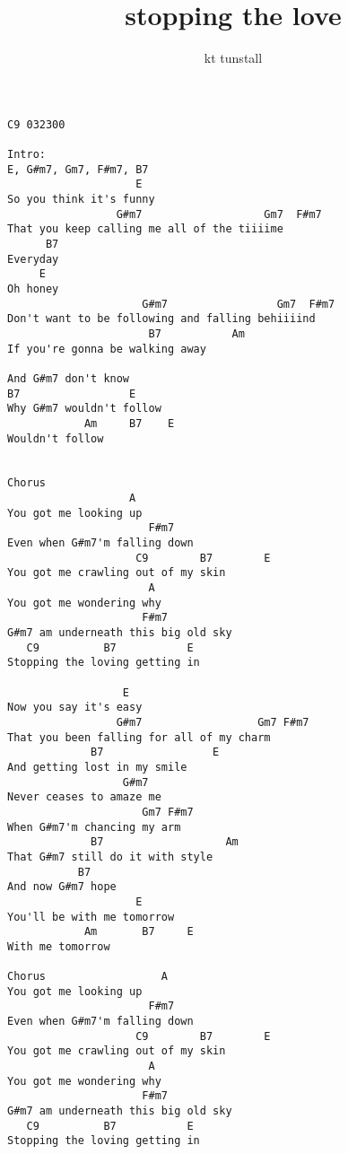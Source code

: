 \author{kt tunstall}
\title{stopping the love}
\maketitle
\begin{verbatim}
C9 032300

Intro:
E, G#m7, Gm7, F#m7, B7
                    E
So you think it's funny
                 G#m7                   Gm7  F#m7
That you keep calling me all of the tiiiime
      B7
Everyday
     E
Oh honey
                     G#m7                 Gm7  F#m7     
Don't want to be following and falling behiiiind
                      B7           Am
If you're gonna be walking away
    
And G#m7 don't know
B7                 E
Why G#m7 wouldn't follow
            Am     B7    E
Wouldn't follow


Chorus
                   A
You got me looking up
                      F#m7
Even when G#m7'm falling down
                    C9        B7        E
You got me crawling out of my skin
                      A
You got me wondering why
                     F#m7
G#m7 am underneath this big old sky
   C9          B7           E
Stopping the loving getting in
        
                  E
Now you say it's easy
                 G#m7                  Gm7 F#m7 
That you been falling for all of my charm
             B7                 E
And getting lost in my smile
                  G#m7
Never ceases to amaze me
                     Gm7 F#m7
When G#m7'm chancing my arm
             B7                   Am
That G#m7 still do it with style
           B7
And now G#m7 hope
                    E
You'll be with me tomorrow
            Am       B7     E
With me tomorrow

Chorus                  A
You got me looking up
                      F#m7
Even when G#m7'm falling down
                    C9        B7        E
You got me crawling out of my skin
                      A
You got me wondering why
                     F#m7
G#m7 am underneath this big old sky
   C9          B7           E
Stopping the loving getting in
\end{verbatim}